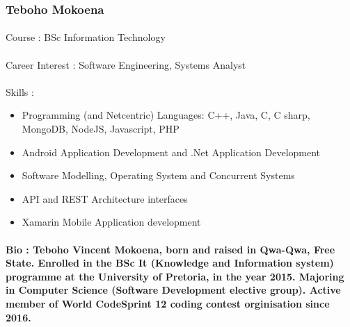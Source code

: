 \documentclass[11pt]{article}
\begin{document}
\subsubsection{Teboho Mokoena}
\paragraph{}Course : BSc Information Technology 
\paragraph{}Career Interest : Software Engineering, Systems Analyst
\paragraph{}Skills :
\begin{itemize}
\item Programming (and Netcentric) Languages: C++, Java, C, C sharp, MongoDB, NodeJS, Javascript, PHP
\item Android Application Development and .Net Application Development
\item Software Modelling, Operating System and Concurrent Systems
\item API and REST Architecture interfaces
\item Xamarin Mobile Application development
\end{itemize}
\paragraph{Bio : Teboho Vincent Mokoena, born and raised in Qwa-Qwa, Free State. Enrolled in
the BSc It (Knowledge and Information system) programme at the University of
Pretoria, in the year 2015. Majoring in Computer Science (Software
Development elective group). Active member of World CodeSprint 12 coding
contest orginisation since 2016.}
\end{document}
